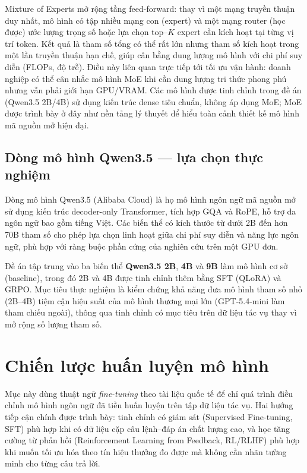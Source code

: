 Mixture of Experts mở rộng tầng feed-forward: thay vì một mạng
truyền thuận duy nhất, mô hình có tập nhiều mạng con
(expert) và một mạng router (học được) ước lượng
trọng số hoặc lựa chọn top--$K$ expert cần kích hoạt tại từng vị trí
token. Kết quả là tham số tổng có thể rất lớn nhưng
tham số kích hoạt trong một lần truyền thuận hạn chế, giúp
cân bằng dung lượng mô hình với chi phí suy diễn (FLOPs, độ
trễ). Điều này liên quan trực tiếp tới tối ưu vận hành: doanh
nghiệp có thể cân nhắc mô hình MoE khi cần dung lượng tri thức
phong phú nhưng vẫn phải giới hạn GPU/VRAM. Các mô hình được tinh chỉnh
trong đề án (Qwen3.5 2B/4B) sử dụng kiến trúc dense tiêu chuẩn, không
áp dụng MoE; MoE được trình bày ở đây như nền tảng lý thuyết để hiểu toàn
cảnh thiết kế mô hình mã nguồn mở hiện đại.

\subsection{Dòng mô hình Qwen3.5 --- lựa chọn thực nghiệm}\label{subsec:qwen}

Dòng mô hình Qwen3.5 (Alibaba Cloud) là họ mô hình ngôn ngữ mã nguồn
mở sử dụng kiến trúc decoder-only Transformer, tích hợp GQA và RoPE,
hỗ trợ đa ngôn ngữ bao gồm tiếng Việt. Các biến thể có kích thước từ
dưới 2B đến hơn 70B tham số cho phép lựa chọn linh hoạt giữa chi phí
suy diễn và năng lực ngôn ngữ, phù hợp với ràng buộc phần cứng của
nghiên cứu trên một GPU đơn.

Đề án tập trung vào ba biến thể \textbf{Qwen3.5 2B}, \textbf{4B} và
\textbf{9B} làm mô hình cơ sở (baseline), trong đó 2B và 4B được tinh
chỉnh thêm bằng SFT (QLoRA) và GRPO. Mục tiêu thực nghiệm là kiểm chứng
khả năng đưa mô hình tham số nhỏ (2B--4B) tiệm cận hiệu suất của mô hình
thương mại lớn (GPT-5.4-mini làm tham chiếu ngoài), thông qua tinh chỉnh
có mục tiêu trên dữ liệu tác vụ thay vì mở rộng số lượng tham số.

\section{Chiến lược huấn luyện mô hình}\label{sec:fine-tuning}

Mục này dùng thuật ngữ \textit{fine-tuning} theo tài liệu quốc tế để chỉ
quá trình điều chỉnh mô hình ngôn ngữ đã tiền huấn luyện trên tập dữ liệu
tác vụ. Hai hướng tiếp cận chính được trình bày: tinh chỉnh có giám sát
(Supervised Fine-tuning, SFT) phù hợp khi có dữ liệu cặp câu lệnh--đáp
án chất lượng cao, và học tăng cường từ phản hồi (Reinforcement Learning
from Feedback, RL/RLHF) phù hợp khi muốn tối ưu hóa theo tín hiệu thưởng
đo được mà không cần nhãn tường minh cho từng câu trả lời.

